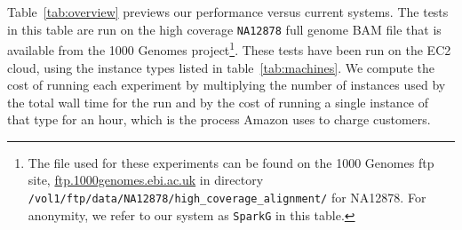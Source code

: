 \documentclass{acm_proc_article-sp}
\begin{document}
Table~\ref{tab:overview} previews our performance versus current systems. The tests in this table are run on the
high coverage \texttt{NA12878} full genome BAM file that is available from the 1000 Genomes
project\footnote{The file used for these experiments can be found on the
1000 Genomes ftp site, \url{ftp.1000genomes.ebi.ac.uk} in directory 
\texttt{/vol1/ftp/data/NA12878/high\_coverage\_alignment/} for NA12878. For anonymity, we refer to our system
as \texttt{SparkG} in this table.}. These tests have been run on the EC2  cloud, using the instance types listed in
table~\ref{tab:machines}. We compute the cost of running each experiment by multiplying the number of instances
used by the total wall time for the run and by the cost of running a single instance of that type for an hour, which is
the process Amazon uses to charge customers.
\end{document}
